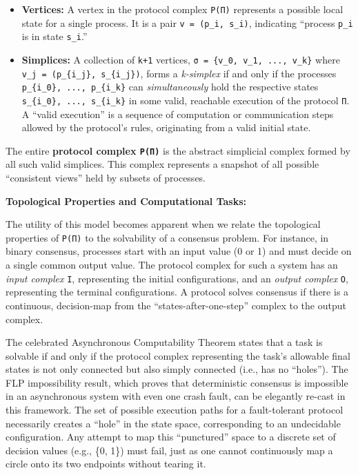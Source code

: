 \documentclass[
]{article}
\begin{document}
\begin{itemize}
\item
  \textbf{Vertices:} A vertex in the protocol complex \texttt{P(Π)}
  represents a possible local state for a single process. It is a pair
  \texttt{v\ =\ (p\_i,\ s\_i)}, indicating ``process \texttt{p\_i} is in
  state \texttt{s\_i}.''
\item
  \textbf{Simplices:} A collection of \texttt{k+1} vertices,
  \texttt{σ\ =\ \{v\_0,\ v\_1,\ ...,\ v\_k\}} where
  \texttt{v\_j\ =\ (p\_\{i\_j\},\ s\_\{i\_j\})}, forms a
  \emph{k-simplex} if and only if the processes
  \texttt{p\_\{i\_0\},\ ...,\ p\_\{i\_k\}} can \emph{simultaneously}
  hold the respective states \texttt{s\_\{i\_0\},\ ...,\ s\_\{i\_k\}} in
  some valid, reachable execution of the protocol \texttt{Π}. A ``valid
  execution'' is a sequence of computation or communication steps
  allowed by the protocol's rules, originating from a valid initial
  state.
\end{itemize}

The entire \textbf{protocol complex \texttt{P(Π)}} is the abstract
simplicial complex formed by all such valid simplices. This complex
represents a snapshot of all possible ``consistent views'' held by
subsets of processes.

\textbf{Topological Properties and Computational Tasks:}

The utility of this model becomes apparent when we relate the
topological properties of \texttt{P(Π)} to the solvability of a
consensus problem. For instance, in binary consensus, processes start
with an input value (0 or 1) and must decide on a single common output
value. The protocol complex for such a system has an \emph{input
complex} \texttt{I}, representing the initial configurations, and an
\emph{output complex} \texttt{O}, representing the terminal
configurations. A protocol solves consensus if there is a continuous,
decision-map from the ``states-after-one-step'' complex to the output
complex.

The celebrated Asynchronous Computability Theorem states that a task is
solvable if and only if the protocol complex representing the task's
allowable final states is not only connected but also simply connected
(i.e., has no ``holes''). The FLP impossibility result, which proves
that deterministic consensus is impossible in an asynchronous system
with even one crash fault, can be elegantly re-cast in this framework.
The set of possible execution paths for a fault-tolerant protocol
necessarily creates a ``hole'' in the state space, corresponding to an
undecidable configuration. Any attempt to map this ``punctured'' space
to a discrete set of decision values (e.g., \{0, 1\}) must fail, just as
one cannot continuously map a circle onto its two endpoints without
tearing it.
\end{document}
